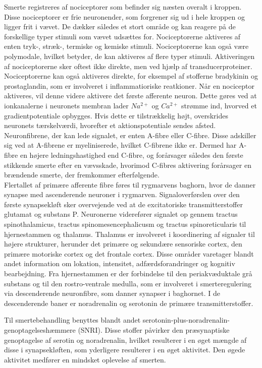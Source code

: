 Smerte registreres af nociceptorer som befinder sig næsten overalt i kroppen. Disse nociceptorer er frie neuronender, som forgrener sig ud i hele kroppen og ligger frit i vævet. De dækker således et stort område og kan reagere på de forskellige typer stimuli som vævet udsættes for. Nociceptorerne aktiveres af enten tryk-, stræk-, termiske og kemiske stimuli. Nociceptorerne kan også være polymodale, hvilket betyder, de kan aktiveres af flere typer stimuli. Aktiveringen af nociceptorerne sker oftest ikke direkte, men ved hjælp af transducerproteiner. Nociceptorerne kan  også aktiveres direkte, for eksempel af stofferne bradykinin og prostaglandin, som er involveret i inflammatioriske reatkioner. \citep{smerter} 
Når en nociceptor aktiveres, vil denne videre aktivere det første afferente neuron. Dette gøres ved at ionkanalerne i neuronets membran lader $Na^{2+}$ og $Ca^{2+}$ strømme ind, hvorved et gradientpotentiale opbygges. Hvis dette er tilstrækkelig højt, overskrides neuronets tærskelværdi, hvorefter et aktionspotentiale sendes afsted. Neuronfibrene, der kan lede signalet, er enten A-fibre eller C-fibre. Disse adskiller sig ved at A-fibrene er myeliniserede, hvilket C-fibrene ikke er. Dermed har A-fibre en højere ledningshastighed end C-fibre, og forårsager således den første stikkende smerte efter en vævsskade, hvorimod C-fibres aktivering forårsager en brændende smerte, der fremkommer efterfølgende. \citep{smerter} \\
Flertallet af primære afferente fibre føres til rygmarvens baghorn, hvor de danner synapse med ascenderende neuroner i rygmarven. Signaloverførslen over den første synapsekløft sker overvejende ved at de excitatoriske transmitterstoffer glutamat og substans P. 
Neuronerne viderefører signalet op gennem tractus spinothalamicus, tractus spinomesencephalicusm og tractus spinoreticularis til hjernestammen og thalamus. Thalamus er involveret i koordinering af signaler til højere strukturer, herunder det primære og sekundære sensoriske cortex, den primære motoriske cortex og det frontale cortex. Disse områder varetager blandt andet information om lokation, intensitet, adfærdsforandringer og kognitiv bearbejdning. 
Fra hjernestammen er der forbindelse til den periakvæduktale grå substans og til den rostro-ventrale medulla, som er involveret i smerteregulering via descenderende neuronfibre, som danner synapser i baghornet. I de descenderende baner er noradrenalin og serotonin de primære transmitterstoffer. \citep{smerter}

Til smertebehandling benyttes blandt andet serotonin-plus-noradrenalin-genoptagelseshæmmere (SNRI). Disse stoffer påvirker den præsynaptiske genoptagelse af serotin og noradrenalin, hvilket resulterer i en øget mængde af disse i synapsekløften, som yderligere resulterer i en øget aktivitet. Den øgede aktivitet medfører en mindsket oplevelse af smerten. \citep{smerter}

